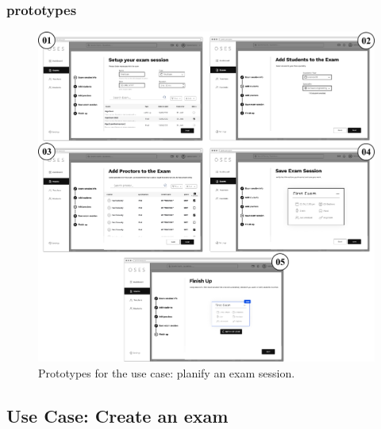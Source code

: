 \documentclass[]{uc2pfecaneva}
\begin{document}
    \subsubsection{prototypes}
    \begin{figure}[h]

        \centering
        \includegraphics[width=\textwidth]{images/prototypes_create_exam_session}

        \caption{Prototypes for the use case: planify an exam session.}
    \end{figure}
    \clearpage








    \raggedright\subsection{Use Case: Create an exam}
\end{document}

